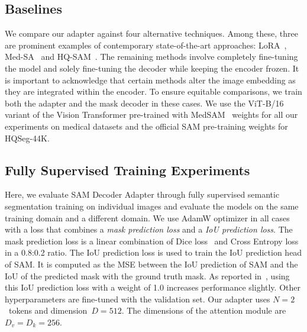 \subsection{Baselines}
We compare our adapter against four alternative techniques. Among these, three are prominent examples of contemporary state-of-the-art approaches: LoRA~, Med-SA~ and HQ-SAM~. The remaining methods involve completely fine-tuning the model and solely fine-tuning the decoder while keeping the encoder frozen. It is important to acknowledge that certain methods alter the image embedding as they are integrated within the encoder. To ensure equitable comparisons, we train both the adapter and the mask decoder in these cases. We use the ViT-B/16~ variant of the Vision Transformer pre-trained with MedSAM~ weights for all our experiments on medical datasets and the official SAM pre-training weights for HQSeg-44K.


\subsection{Fully Supervised Training Experiments}
Here, we evaluate SAM Decoder Adapter through fully supervised semantic segmentation training on individual images and evaluate the models on the same training domain and a different domain. 
We use AdamW optimizer in all cases with a loss that combines a \emph{mask prediction loss} and a \emph{IoU prediction loss}. The mask prediction loss is a linear combination of Dice loss~ and Cross Entropy loss in a 0.8:0.2 ratio. The IoU prediction loss is used to train the IoU prediction head of SAM. It is computed as the MSE between the IoU prediction of SAM and the IoU of the predicted mask with the ground truth mask. As reported in~, using this IoU prediction loss with a weight of 1.0 increases performance slightly. Other hyperparameters are fine-tuned with the validation set. Our adapter uses $N=2$~tokens and dimension~$D=512$. The dimensions of the attention module are~$D_v=D_k=256$.

